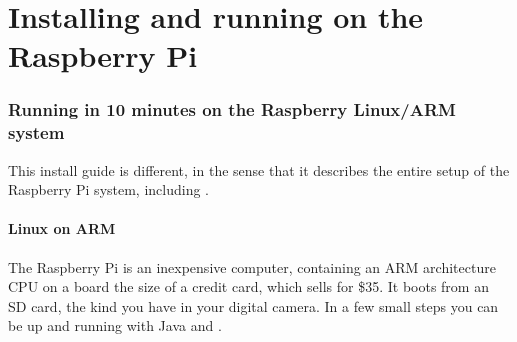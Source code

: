 \chapter{Installing and running on the Raspberry Pi}
\subsection{Running \nr{} in 10 minutes on the Raspberry Linux/ARM system}
This install guide is different, in the sense that it describes the entire setup of the Raspberry Pi system, including \nr{}.

\subsubsection{Linux on ARM}
The Raspberry Pi is an inexpensive computer, containing an ARM architecture CPU on a board the size of a credit card, which sells for \$35. It boots from an SD card, the kind you have in your digital camera. In a few small steps you can be up and running with Java and \nr{}. 
